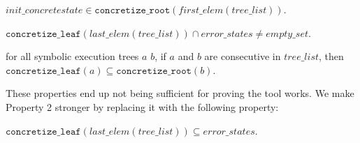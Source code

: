 \setcounter{property}{0}
\renewcommand{\theproperty}{Z.\arabic{property}}
\begin{property}
  \label{prop:startinit}
$init\_concrete state \in \mathtt{concretize\_root}(first\_elem (tree\_list))$.
\end{property}

\begin{property}
  \label{prop:enderror}
$ \mathtt{concretize\_leaf} (last\_elem (tree\_list)) \cap error\_states 
\neq empty\_set $.
\end{property}

\begin{property}
  \label{prop:stitch}
for all symbolic execution trees $a$ $b$, 
if $a$ and $b$ are consecutive in $tree\_list$, then 
$\mathtt{concretize\_leaf} (a) \subseteq
\mathtt{concretize\_root}(b) $.
\end{property}

These properties end up not being sufficient for proving the tool works. 
We make Property 2 stronger by replacing it with the following property:

\setcounter{property}{1}
\renewcommand{\theproperty}{Z.\arabic{property}'}
\begin{property}
  \label{prop:correctedz2}
$\mathtt{concretize\_leaf} (last\_elem (tree\_list))
\subseteq error\_states $.
\end{property}
